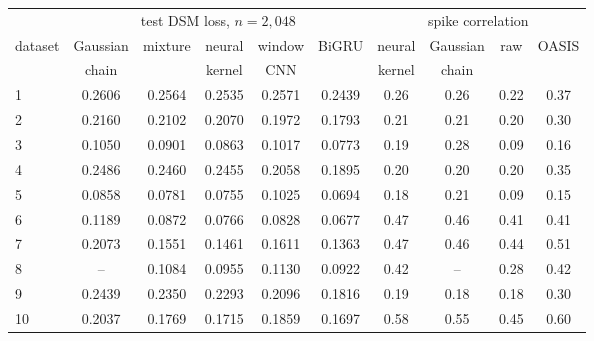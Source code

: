 \begin{tabular}{@{}lccccc@{\hskip 14pt}cccc@{}}
\toprule
 & \multicolumn{5}{c}{test DSM loss, $n=2{,}048$} & \multicolumn{4}{c}{spike correlation}\\
\cmidrule(lr){2-6}\cmidrule(l{8pt}r){7-10}
dataset & Gaussian & mixture & neural & window & BiGRU & neural & Gaussian & raw & OASIS\\
 & chain & & kernel & CNN & & kernel & chain & & \\
\midrule
1 & 0.2606 & 0.2564 & 0.2535 & 0.2571 & 0.2439 & 0.26 & 0.26 & 0.22 & 0.37\\
2 & 0.2160 & 0.2102 & 0.2070 & 0.1972 & 0.1793 & 0.21 & 0.21 & 0.20 & 0.30\\
3 & 0.1050 & 0.0901 & 0.0863 & 0.1017 & 0.0773 & 0.19 & 0.28 & 0.09 & 0.16\\
4 & 0.2486 & 0.2460 & 0.2455 & 0.2058 & 0.1895 & 0.20 & 0.20 & 0.20 & 0.35\\
5 & 0.0858 & 0.0781 & 0.0755 & 0.1025 & 0.0694 & 0.18 & 0.21 & 0.09 & 0.15\\
6 & 0.1189 & 0.0872 & 0.0766 & 0.0828 & 0.0677 & 0.47 & 0.46 & 0.41 & 0.41\\
7 & 0.2073 & 0.1551 & 0.1461 & 0.1611 & 0.1363 & 0.47 & 0.46 & 0.44 & 0.51\\
8 & -- & 0.1084 & 0.0955 & 0.1130 & 0.0922 & 0.42 & -- & 0.28 & 0.42\\
9 & 0.2439 & 0.2350 & 0.2293 & 0.2096 & 0.1816 & 0.19 & 0.18 & 0.18 & 0.30\\
10 & 0.2037 & 0.1769 & 0.1715 & 0.1859 & 0.1697 & 0.58 & 0.55 & 0.45 & 0.60\\
\bottomrule
\end{tabular}
